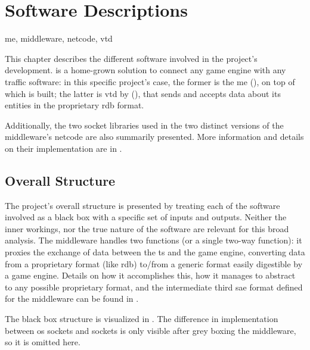 \chapter{Software Descriptions}\label{ch:software}

\begin{keywords}
	me, middleware, netcode, vtd
\end{keywords}

This chapter describes the different software involved in the project's development.  is a home-grown solution to connect any game engine with any traffic software: in this specific project's case, the former is the \gls{me} (), on top of which  is built; the latter is \gls{vtd} by  (), that sends and accepts data about its entities in the proprietary \gls{rdb} format.

Additionally, the two socket libraries used in the two distinct versions of the \gls{middleware}'s netcode are also summarily presented. More information and details on their implementation are in .

\section{Overall Structure}\label{sc:software:overall}

The project's overall structure is presented by treating each of the software involved as a black box with a specific  set of inputs and outputs. Neither the inner workings, nor the true nature of the software are relevant for this broad analysis. The \gls{middleware} handles two functions (or a single two-way function): it proxies the exchange of data between the \gls{ts} and the game engine, converting data from a proprietary format (like \gls{rdb}) to/from a generic format easily digestible by a game engine. Details on how it accomplishes this, how it manages to abstract to any possible proprietary format, and the intermediate third \gls{sae} format defined for the \gls{middleware} can be found in .



The black box structure is visualized in . The difference in implementation between \gls{os} sockets and  sockets is only visible after grey boxing the \gls{middleware}, so it is omitted here.

